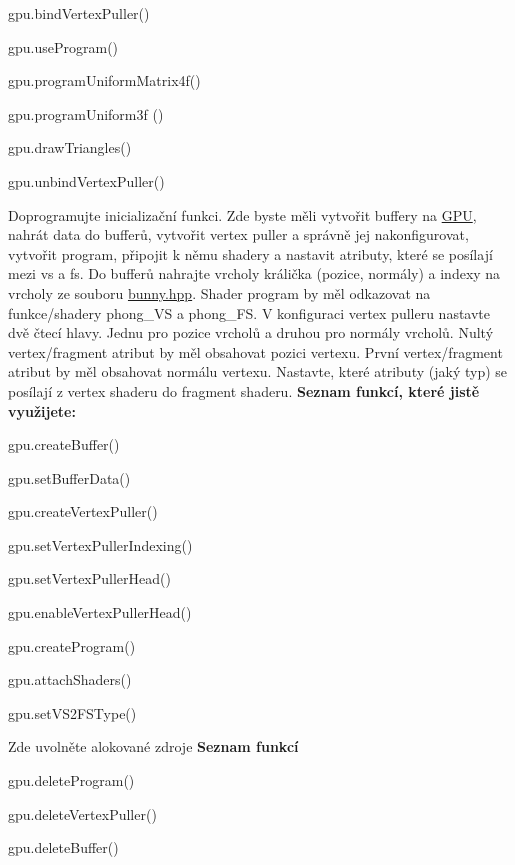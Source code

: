 \begin{DoxyRefList}
\begin{DoxyItemize}
\item gpu.\+bind\+Vertex\+Puller()
\item gpu.\+use\+Program()
\item gpu.\+program\+Uniform\+Matrix4f()
\item gpu.\+program\+Uniform3f ()
\item gpu.\+draw\+Triangles()
\item gpu.\+unbind\+Vertex\+Puller()  
\end{DoxyItemize}
\item[\label{todo__todo000040}%
\Hypertarget{todo__todo000040}%
Global \hyperlink{group__cpu__side_ga609f942b12f18a74313937d4aa071c0b}{Phong\+Method\+:\+:Phong\+Method} ()]Doprogramujte inicializační funkci. Zde byste měli vytvořit buffery na \hyperlink{classGPU}{G\+PU}, nahrát data do bufferů, vytvořit vertex puller a správně jej nakonfigurovat, vytvořit program, připojit k němu shadery a nastavit atributy, které se posílají mezi vs a fs. Do bufferů nahrajte vrcholy králička (pozice, normály) a indexy na vrcholy ze souboru \hyperlink{bunny_8hpp}{bunny.\+hpp}. Shader program by měl odkazovat na funkce/shadery phong\+\_\+\+VS a phong\+\_\+\+FS. V konfiguraci vertex pulleru nastavte dvě čtecí hlavy. Jednu pro pozice vrcholů a druhou pro normály vrcholů. Nultý vertex/fragment atribut by měl obsahovat pozici vertexu. První vertex/fragment atribut by měl obsahovat normálu vertexu. Nastavte, které atributy (jaký typ) se posílají z vertex shaderu do fragment shaderu. {\bfseries Seznam funkcí, které jistě využijete\+:}
\begin{DoxyItemize}
\item gpu.\+create\+Buffer()
\item gpu.\+set\+Buffer\+Data()
\item gpu.\+create\+Vertex\+Puller()
\item gpu.\+set\+Vertex\+Puller\+Indexing()
\item gpu.\+set\+Vertex\+Puller\+Head()
\item gpu.\+enable\+Vertex\+Puller\+Head()
\item gpu.\+create\+Program()
\item gpu.\+attach\+Shaders()
\item gpu.\+set\+V\+S2\+F\+S\+Type()  
\end{DoxyItemize}
\item[\label{todo__todo000042}%
\Hypertarget{todo__todo000042}%
Global \hyperlink{group__cpu__side_ga64fbf177f01aca9027d510611a2dad73}{Phong\+Method\+:\+:$\sim$\+Phong\+Method} ()]Zde uvolněte alokované zdroje {\bfseries Seznam funkcí}
\begin{DoxyItemize}
\item gpu.\+delete\+Program()
\item gpu.\+delete\+Vertex\+Puller()
\item gpu.\+delete\+Buffer() 
\end{DoxyItemize}
\end{DoxyRefList}